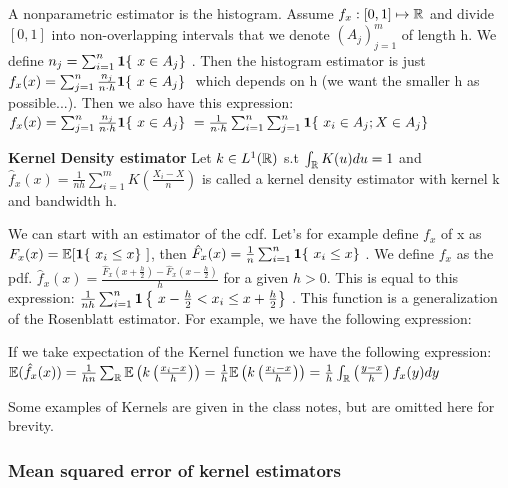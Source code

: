 \documentclass{article}
\begin{document}
A nonparametric estimator is the histogram. Assume \(f_x : [0,1]\mapsto \mathbb{R}\) and divide \([0,1]\) into non-overlapping intervals that we denote \((A_j)_{j=1}^{m}\) of length h. We define \(n_{j}= \sum_{i=1}^{n}\mathbf{1} \{\ x\in A_j \}\ \). Then the histogram estimator is just \(f_{x}(x)=\sum_{j=1}^{n} \frac{n_j}{n\cdot h} \mathbf{1} \{\ x\in A_j \}\ \) which depends on h (we want the smaller h as possible...). Then we also have this expression: \(f_{x}(x)=\sum_{j=1}^{n} \frac{n_j}{n\cdot h} \indf \{\ x\in A_j \}\ = \frac{1}{n\cdot h}\sum_{i=1}^{n} \sum_{j=1}^{n}  \indf \{\ x_{i} \in A_j ; X \in A_j \}\ \) \\

\begin{definition} \textbf{Kernel Density estimator}
    Let \(k \in L^{1}(\mathbb{R})\) s.t \( \int_{\mathbb{R}}K(u) du=1\) and \(\hat{f}_{x}(x)=\frac{1}{nh}\sum_{i=1}^{m}K \left(\frac{X_{i}-X}{n}\right)\) is called a kernel density estimator with kernel k and bandwidth h. 
\end{definition}

\begin{example}
    We can start with an estimator of the cdf. Let's for example define \(f_x\) of x as \(F_{x}(x)= \E[\indf \{\ x_i \leq x \}\ ] \), then \( \hat{F}_{x}(x)= \frac{1}{n} \sum_{i=1}^{n}\mathbf{1} \{\ x_i \leq x \}\ \). We define $f_x$ as the pdf. \(\hat{f}_{x}(x)=\frac{\hat{F}_{x}\left(x+\frac{h}{2}\right)-\hat{F}_{x}\left(x-\frac{h}{2}\right)}{h}\) for a given $h>0$. This is equal to this expression: \(\frac{1}{nh}\sum_{i=1}^{n} \indf \left\{\ x-\frac{h}{2}<x_i \leq x+\frac{h}{2} \right\}\ \). This function is a generalization of the Rosenblatt estimator. For example, we have the following expression: 
\end{example}

\begin{remark}
    If we take expectation of the Kernel function we have the following expression: \(\mathbb{E}(\hat{f}_{x}(x))= \frac{1}{hn}\sum_{\mathbb{R}} \mathbb{E} \left(k\left( \frac{x_i-x}{h}\right)\right)= \frac{1}{h} \mathbb{E} \left(k \left( \frac{x_i-x}{h}\right)\right)  = \frac{1}{h}\int_{\mathbb{R}}\left( \frac{y-x}{h}\right) f_{x}(y) dy\)
\end{remark}


Some examples of Kernels are given in the class notes, but are omitted here for brevity. 

\subsubsection{Mean squared error of kernel estimators}
\end{document}
